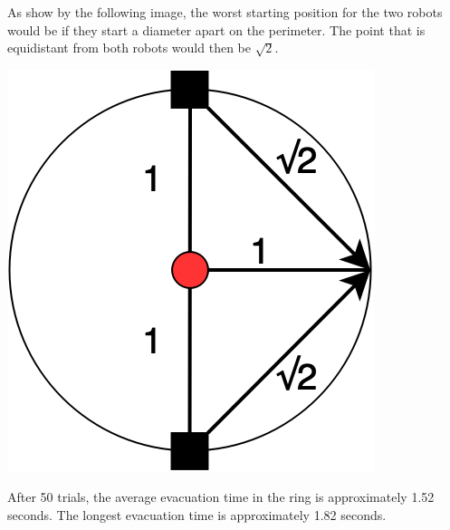 \documentclass[12pt,letterpaper]{article}
\begin{document}
        As show by the following image, the worst starting position for the two robots would be if they start a diameter apart on the perimeter. The point that is equidistant from both robots would then be $\sqrt{2}$.
        
        \begin{center}
            \includegraphics[scale=0.3]{images/scenario-3-worstcase.png}
        \end{center}
        
        After 50 trials, the average evacuation time in the ring is approximately 1.52 seconds. The longest evacuation time is approximately 1.82 seconds.
        
        \newpage
\end{document}
